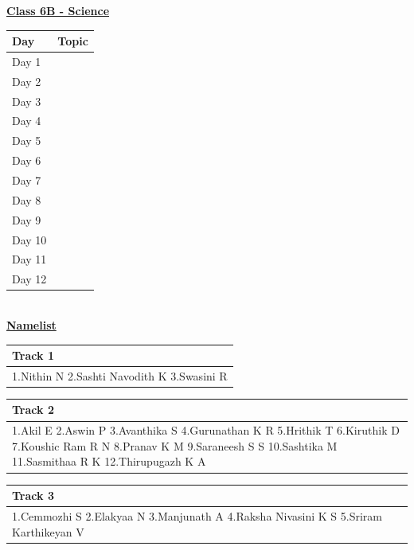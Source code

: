 \documentclass[12pt,a4paper]{article}
\newcommand{\namelisttable}[5]{
\renewcommand{\arraystretch}{#1}
\normalsize
\begin{tabular}{|>{\RaggedRight\arraybackslash} m{#2cm}|}
\hline
\rowcolor{#3} \textbf{#4} \\
\hline
#5\\
\hline
\end{tabular}
\vspace{0.2cm}
}
\newcommand{\sixBSciPlan}{
\renewcommand{\arraystretch}{1.5}
\centering
\begin{tabular}{|>{\centering\arraybackslash}m{2cm}|>{\centering\arraybackslash}m{10cm}|}
\hline
\rowcolor{pink!50} \textbf{Day} & \textbf{Topic} \\
\hline
Day 1 & \multirow{2}{10cm}{\centering Adaptations of animals} \\
\cline{1-1}
Day 2 & \\
\hline
Day 3 & \multirow{2}{10cm}{\centering Properties and methods of separations} \\
\cline{1-1}
Day 4 & \\
\hline
Day 5 & \multirow{2}{10cm}{\centering Structure of animals} \\
\cline{1-1}
Day 6 & \\
\hline
Day 7 & \multirow{2}{10cm}{\centering Structure and classification of plants} \\
\cline{1-1}
Day 8 & \\
\hline
Day 9 & \multirow{2}{10cm}{\centering Composition of air} \\
\cline{1-1}
Day 10 & \\
\hline
Day 11 & \multirow{2}{10cm}{\centering Light and its properties} \\
\cline{1-1}
Day 12 & \\
\hline
\end{tabular}
}
\newcommand{\heading}[1]{\centering \underline{\textbf{\Large  #1}} }
\begin{document}
\newpage
\heading{Class 6B  - Science}\\
\vspace{0.75cm}
\sixBSciPlan\\
\vspace{1cm}
\heading{Namelist}
\begin{multicols}{3}
\namelisttable{1.5}{5}{pink!40}{Track 1}{1.Nithin N\newline
2.Sashti Navodith K\newline
3.Swasini R}


\namelisttable{1.5}{5}{pink!40}{Track 2}{1.Akil E\newline
2.Aswin P\newline
3.Avanthika S\newline
4.Gurunathan K R\newline
5.Hrithik T\newline
6.Kiruthik D\newline
7.Koushic Ram R N\newline
8.Pranav K M\newline
9.Saraneesh S S\newline
10.Sashtika M\newline
11.Sasmithaa R K\newline
12.Thirupugazh K A}


\namelisttable{1.5}{5}{pink!40}{Track 3}{1.Cemmozhi S\newline
2.Elakyaa N\newline
3.Manjunath A\newline
4.Raksha Nivasini K S\newline
5.Sriram Karthikeyan V}


\end{multicols}
\end{document}
